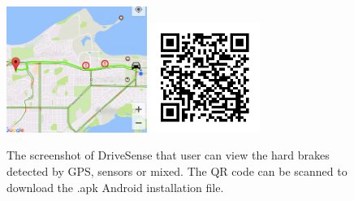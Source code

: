 \begin{figure}[!tb]
\begin{center}
\includegraphics[width=1.8in, angle=0]{Figs/DriveSense/cut_app.png}
\includegraphics[width=1.4in, angle=0]{Figs/DriveSense/qrcode_xsense.png}
	\vspace{0.0cm}
\caption{The screenshot of DriveSense that user can view the hard brakes
	detected by GPS, sensors or mixed. The QR code can be scanned 
	to download the .apk Android installation file.}
\vspace{-0.2cm}
\label{xsense_app}
\end{center}
\end{figure}




